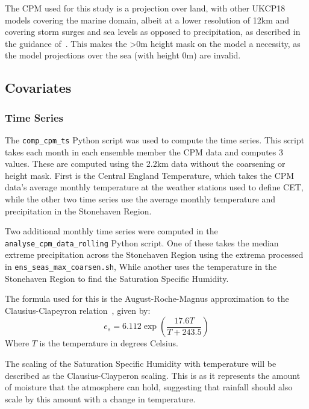 The CPM used for this study is a projection over land,
    with other UKCP18 models covering the marine domain,
    albeit at a lower resolution of 12km and covering storm surges and sea levels as opposed to precipitation,
    as described in the guidance of~\cite{model_data}.
This makes the >0m height mask on the model a necessity,
    as the model projections over the sea (with height 0m) are invalid.

\subsection{Covariates}\label{subsec:covfit}

\subsubsection{Time Series}

The \texttt{comp\_cpm\_ts} Python script was used to compute the time series.
This script takes each month in each ensemble member the CPM data and computes 3 values.
These are computed using the 2.2km data without the coarsening or height mask.
First is the Central England Temperature,
    which takes the CPM data's average monthly temperature at the weather stations used to define CET,
    while the other two time series use the average monthly temperature and precipitation in the Stonehaven Region.

Two additional monthly time series were computed in the \texttt{analyse\_cpm\_data\_rolling} Python script.
One of these takes the median extreme precipitation across the Stonehaven Region
    using the extrema processed in \texttt{ens\_seas\_max\_coarsen.sh},
While another uses the temperature in the Stonehaven Region to find the Saturation Specific Humidity.

The formula used for this is the August-Roche-Magnus approximation to the Clausius-Clapeyron relation~\cite{Alduchov_Eskridge_1996}, given by:
\begin{equation}\label{eq:qsat}
    e_s = 6.112 \exp\left( \frac{17.6 T}{T + 243.5} \right)
\end{equation}
Where $T$ is the temperature in degrees Celsius.

The scaling of the Saturation Specific Humidity with temperature will be described as the Clausius-Clayperon scaling.
This is as it represents the amount of moisture that the atmosphere can hold,
    suggesting that rainfall should also scale by this amount with a change in temperature.

